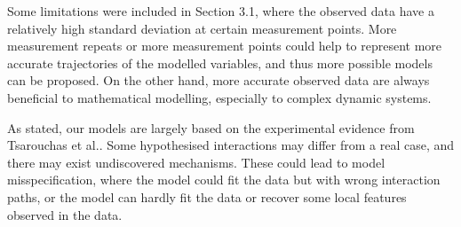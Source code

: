 


Some limitations were included in Section 3.1, where the observed data have a relatively high standard deviation at certain measurement points. More measurement repeats or more measurement points could help to represent more accurate trajectories of the modelled variables, and thus more possible models can be proposed. On the other hand, more accurate observed data are always beneficial to mathematical modelling, especially to complex dynamic systems.

As stated, our models are largely based on the experimental evidence from Tsarouchas et al.\cite{ref:Tsarouchas}. Some hypothesised interactions may differ from a real case, and there may exist undiscovered mechanisms. These could lead to model misspecification, where the model could fit the data but with wrong interaction paths, or the model can hardly fit the data or recover some local features observed in the data.















